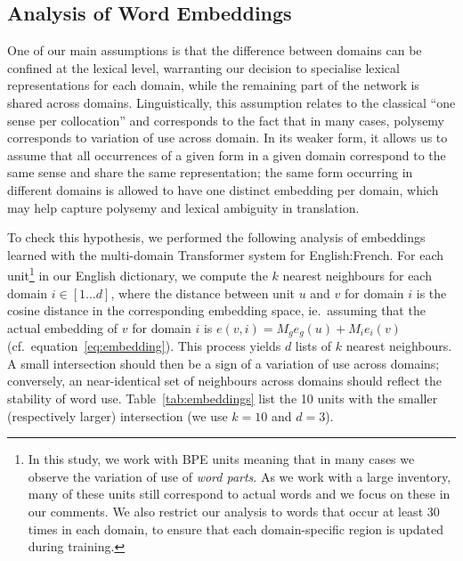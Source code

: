\subsection{Analysis of Word Embeddings \label{ssec:word_embeddings}}
One of our main assumptions is that the difference between domains can be confined at the lexical level, warranting our decision to specialise lexical representations for each domain, while the remaining part of the network is shared across domains. Linguistically, this assumption relates to the classical ``one sense per collocation'' \cite{Yarowsky93onesense} and corresponds to the fact that in many cases, polysemy corresponds to variation of use across domain. In its weaker form, it allows us to assume that all occurrences of a given form in a given domain correspond to the same sense and share the same representation; the same form occurring in different domains is allowed to have one distinct embedding per domain, which may help capture polysemy and lexical ambiguity in translation. 

To check this hypothesis, we performed the following analysis of embeddings learned with the multi-domain Transformer system for English:French. For each unit\footnote{In this study, we work with BPE units meaning that in many cases we observe the variation of use of \emph{word parts}. As we work with a large inventory, many of these units still correspond to actual words and we focus on these in our comments. We also restrict our analysis to words that occur at least 30 times in each domain, to ensure that each domain-specific region is updated during training.} in our English dictionary, we compute the $k$ nearest neighbours for each domain $i \in [1\dots{}d]$, where the distance between unit $u$ and $v$ for domain $i$ is the cosine distance in the corresponding embedding space, ie.\ assuming that the actual embedding of $v$ for domain $i$ is $e(v,i) = M_ge_g(u) + M_ie_i(v)$ (cf.\ equation~\eqref{eq:embedding}). This process yields $d$ lists of $k$ nearest neighbours. A small intersection should then be a sign of a variation of use across domains; conversely, an near-identical set of neighbours across domains should reflect the stability of word use. Table~\ref{tab:embeddings} list the 10 units with the smaller (respectively larger) intersection (we use $k=10$ and $d=3$). 

